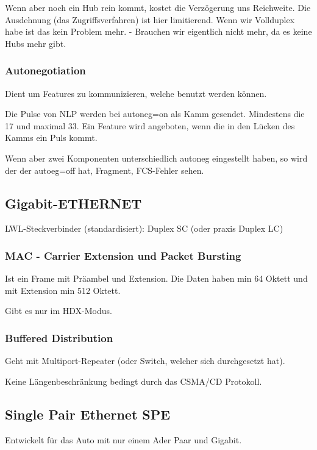 \documentclass[a4paper]{article}
\begin{document}
Wenn aber noch ein Hub rein kommt, kostet die Verzögerung uns Reichweite. Die Ausdehnung (das Zugriffsverfahren) ist hier limitierend. Wenn wir Vollduplex habe ist das kein Problem mehr. - Brauchen wir eigentlich nicht mehr, da es keine Hubs mehr gibt.

\subsubsection{Autonegotiation}

Dient um Features zu kommunizieren, welche benutzt werden können.

Die Pulse von NLP werden bei autoneg=on als Kamm gesendet. Mindestens die 17 und maximal 33. Ein Feature wird angeboten, wenn die in den Lücken des Kamms ein Puls kommt.

Wenn aber zwei Komponenten unterschiedlich autoneg eingestellt haben, so wird der der autoeg=off hat, Fragment, FCS-Fehler sehen.

\subsection{Gigabit-ETHERNET}

LWL-Steckverbinder (standardisiert): Duplex SC (oder praxis Duplex LC)


\subsubsection{MAC - Carrier Extension und Packet Bursting}

Ist ein Frame mit Präambel und Extension. Die Daten haben min 64 Oktett und mit Extension min 512 Oktett.

Gibt es nur im HDX-Modus.

\subsubsection{Buffered Distribution}

Geht mit Multiport-Repeater (oder Switch, welcher sich durchgesetzt hat).

Keine Längenbeschränkung bedingt durch das CSMA/CD Protokoll.

\subsection{Single Pair Ethernet SPE}

Entwickelt für das Auto mit nur einem Ader Paar und Gigabit.
\end{document}
